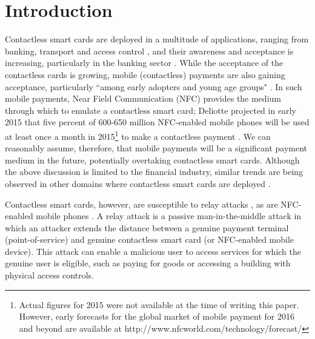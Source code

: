 \documentclass{article}
\begin{document}
\section{Introduction}

Contactless smart cards are deployed in a multitude of applications, ranging from banking, transport and access control \cite{markantonakis2013secure}, and their awareness and acceptance is increasing, particularly in the banking sector \cite{UKCardsAnnualRep2015a}.  While the acceptance of the contactless cards is growing, mobile (contactless) payments are also gaining acceptance, particularly ``among early adopters and young age groups" \cite{UKCardsPayment2015a}.  In such mobile payments, Near Field Communication (NFC) provides the medium through which to emulate a contactless smart card; Deliotte projected in early 2015 that five percent of 600-650 million NFC-enabled mobile phones will be used at least once a month in 2015\footnote{Actual figures for 2015 were not available at the time of writing this paper. However, early forecasts for the global market of mobile payment for 2016 and beyond are available at http://www.nfcworld.com/technology/forecast/} to make a contactless payment \cite{Deloitte2015}.  We can reasonably assume, therefore, that mobile payments will be a significant payment medium in the future, potentially overtaking contactless smart cards. Although the above discussion is limited to the financial industry, similar trends are being observed in other domains where contactless smart cards are deployed \cite{VeriFone2010}.

Contactless smart cards, however, are susceptible to relay attacks \cite{Hancke2009615,Hancke06,kfir2005picking}, as are NFC-enabled mobile phones \cite{FrancisHMM11,FrancisHMM10,madlmayr2008nfc,6482441}.  A relay attack is a passive man-in-the-middle attack in which an attacker extends the distance between a genuine payment terminal (point-of-service) and genuine contactless smart card (or NFC-enabled mobile device). This attack can enable a malicious user to access services for which the genuine user is eligible, such as paying for goods or accessing a building with physical access controls. 
\end{document}
